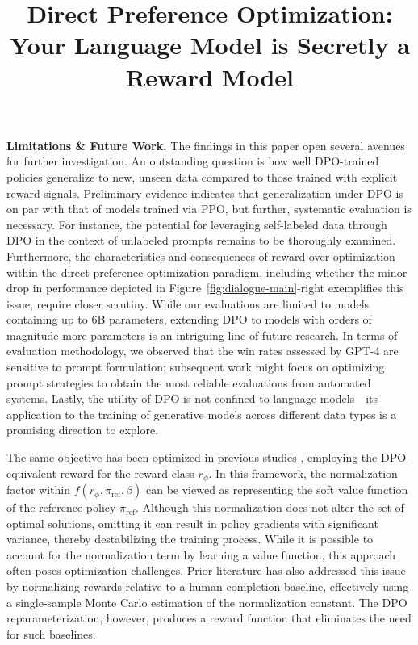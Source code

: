 \title{Direct Preference Optimization: Your Language Model is Secretly a Reward Model}
\textbf{Limitations \& Future Work.} The findings in this paper open several avenues for further investigation. An outstanding question is how well DPO-trained policies generalize to new, unseen data compared to those trained with explicit reward signals. Preliminary evidence indicates that generalization under DPO is on par with that of models trained via PPO, but further, systematic evaluation is necessary. For instance, the potential for leveraging self-labeled data through DPO in the context of unlabeled prompts remains to be thoroughly examined. Furthermore, the characteristics and consequences of reward over-optimization within the direct preference optimization paradigm, including whether the minor drop in performance depicted in Figure~\ref{fig:dialogue-main}-right exemplifies this issue, require closer scrutiny. While our evaluations are limited to models containing up to 6B parameters, extending DPO to models with orders of magnitude more parameters is an intriguing line of future research. In terms of evaluation methodology, we observed that the win rates assessed by GPT-4 are sensitive to prompt formulation; subsequent work might focus on optimizing prompt strategies to obtain the most reliable evaluations from automated systems. Lastly, the utility of DPO is not confined to language models—its application to the training of generative models across different data types is a promising direction to explore.

The same objective has been optimized in previous studies 
\citep{ziegler2020finetuning, stiennon2022learning, bai2022training, ouyang2022training}, employing the DPO-equivalent reward for the reward class $r_{\phi}$. In this framework, the normalization factor within $f(r_{\phi}, \pi_\text{ref}, \beta)$ can be viewed as representing the soft value function of the reference policy $\pi_\text{ref}$. Although this normalization does not alter the set of optimal solutions, omitting it can result in policy gradients with significant variance, thereby destabilizing the training process. While it is possible to account for the normalization term by learning a value function, this approach often poses optimization challenges. Prior literature has also addressed this issue by normalizing rewards relative to a human completion baseline, effectively using a single-sample Monte Carlo estimation of the normalization constant. The DPO reparameterization, however, produces a reward function that eliminates the need for such baselines.

